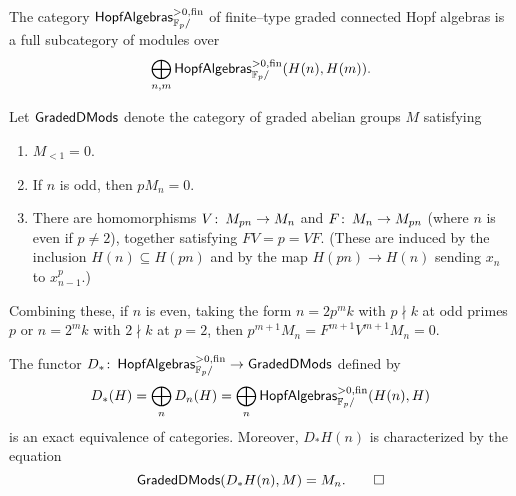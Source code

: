 \begin{corollary}
The category $\mathsf{HopfAlgebras}^{> 0, \mathrm{fin}}_{\mathbb F_p/}$ of finite--type graded connected Hopf algebras is a full subcategory of modules over \[\bigoplus_{n, m} \mathsf{HopfAlgebras}^{> 0, \mathrm{fin}}_{\mathbb F_p/}(H(n), H(m)).\]
\end{corollary}

\begin{definition}
Let $\mathsf{GradedDMods}$ denote the category of graded abelian groups $M$ satisfying
\begin{enumerate}
\item $M_{< 1} = 0$.
\item If $n$ is odd, then $pM_n = 0$.
\item There are homomorphisms $V\colon\thinspace M_{pn} \to M_n$ and $F\colon\thinspace M_n \to M_{pn}$ (where $n$ is even if $p \ne 2$), together satisfying $FV = p = VF$.  (These are induced by the inclusion $H(n) \subseteq H(pn)$ and by the map $H(pn) \to H(n)$ sending $x_n$ to $x_{n-1}^p$.)
\end{enumerate}
\end{definition}

\begin{remark}
Combining these, if $n$ is even, taking the form $n = 2p^m k$ with $p \nmid k$ at odd primes $p$ or $n = 2^m k$ with $2 \nmid k$ at $p = 2$, then $p^{m+1} M_n = F^{m+1} V^{m+1} M_n = 0$.
\end{remark}

\begin{theorem}
The functor $D_*\colon\thinspace \mathsf{HopfAlgebras}^{>0, \mathrm{fin}}_{\mathbb F_p/} \to \mathsf{GradedDMods}$ defined by \[D_*(H) = \bigoplus_n D_n(H) = \bigoplus_n \mathsf{HopfAlgebras}^{>0, \mathrm{fin}}_{\mathbb F_p/}(H(n), H)\] is an exact equivalence of categories.  Moreover, $D_* H(n)$ is characterized by the equation \[\mathsf{GradedDMods}(D_* H(n), M) = M_n. \qed\]
\end{theorem}










